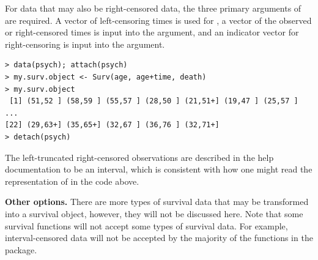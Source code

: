 \documentclass[11pt]{article}
\begin{document}
For  data that may also be right-censored data, the three primary arguments of  are required. A vector of left-censoring times is used for , a vector of the observed or right-censored times is input into the  argument, and an indicator vector for right-censoring is input into the  argument.
\begin{verbatim}
> data(psych); attach(psych)
> my.surv.object <- Surv(age, age+time, death)
> my.surv.object
 [1] (51,52 ] (58,59 ] (55,57 ] (28,50 ] (21,51+] (19,47 ] (25,57 ]
...
[22] (29,63+] (35,65+] (32,67 ] (36,76 ] (32,71+]
> detach(psych)
\end{verbatim}
The left-truncated right-censored observations are described in the  help documentation to be an interval, which is consistent with how one might read the representation of  in the code above.

\textbf{Other options.} %
There are more types of survival data that may be transformed into a survival object, however, they will not be discussed here. Note that some survival functions will not accept some types of survival data. For example, interval-censored data will not be accepted by the majority of the functions in the  package.

\pagebreak

{}\vspace{-1mm}\par
{}
\label{kapMeiEstimateAndBounds}
\end{document}
